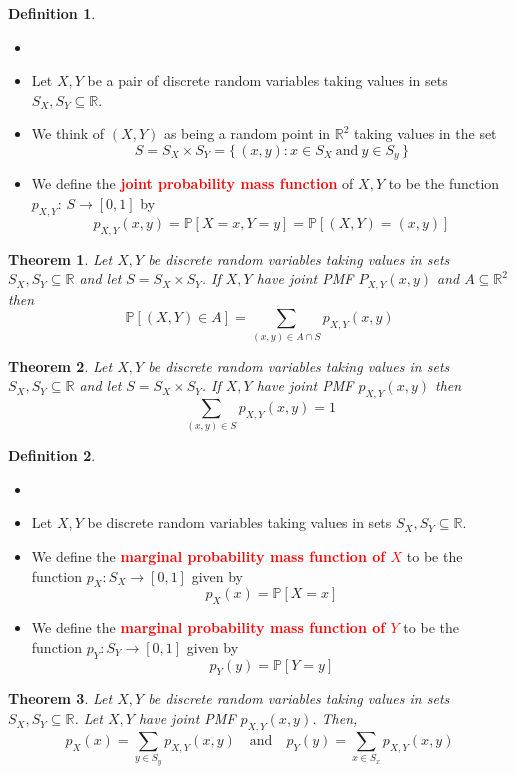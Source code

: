 \documentclass{article}
\newcommand{\PP}{\mathbb{P}}
\newcommand{\R}{\mathbb{R}}
\newcommand{\bfred}[1]{\textcolor{red}{\textbf{#1}}}
\theoremstyle{plain}
\newtheorem{thm}{Theorem}[section]
\theoremstyle{definition}
\newtheorem{defn}{Definition}[section]
\theoremstyle{remark}
\begin{document}
\begin{defn}
    \begin{itemize}
        \item []
        \item Let $X,Y$ be a pair of discrete random variables taking values in sets $S_X,S_Y\subseteq\R$.
        \item We think of $(X,Y)$ as being a random point in $\R^2$ taking values in the set \[S=S_X\times S_Y=\{\,(x,y):x\in S_X \ \text{and} \ y\in S_y\,\}\]
        \item We define the \bfred{joint probability mass function} of $X,Y$ to be the function $p_{X,Y}$: $S\rightarrow[0,1]$ by \[p_{X,Y}(x,y)=\PP[X=x,Y=y]=\PP[(X,Y)=(x,y)]\]
    \end{itemize}
\end{defn}

\begin{thm}
    Let $X,Y$ be discrete random variables taking values in sets $S_X,S_Y\subseteq\R$ and let $S=S_X\times S_Y$. If $X,Y$ have joint PMF $P_{X,Y}(x,y)$ and $A\subseteq\R^2$ then \[\PP[(X,Y)\in A]=\sum_{(x,y)\in A \cap S}p_{X,Y}(x,y)\]
\end{thm}

\begin{thm}
    Let $X,Y$ be discrete random variables taking values in sets $S_X,S_Y\subseteq\R$ and let $S=S_X\times S_Y$. If $X,Y$ have joint PMF $p_{X,Y}(x,y)$ then \[\sum_{(x,y)\in S}p_{X,Y}(x,y)=1\]
\end{thm}

\begin{defn}
    \begin{itemize}
        \item []
        \item Let $X,Y$ be discrete random variables taking values in sets $S_X,S_Y\subseteq\R$.
        \item We define the \bfred{marginal probability mass function of $X$} to be the function $p_X:S_X\rightarrow[0,1]$ given by \[p_X(x)=\PP[X=x]\]
        \item We define the \bfred{marginal probability mass function of $Y$} to be the function $p_Y:S_Y\rightarrow[0,1]$ given by \[p_Y(y)=\PP[Y=y]\]
    \end{itemize}
\end{defn}

\begin{thm}
    Let $X,Y$ be discrete random variables taking values in sets $S_X,S_Y\subseteq\R$. Let $X,Y$ have joint PMF $p_{X,Y}(x,y)$. Then, \[p_X(x)=\sum_{y\in S_y}p_{X,Y}(x,y)\quad\text{and}\quad p_Y(y)=\sum_{x\in S_x}p_{X,Y}(x,y)\]
\end{thm}
\end{document}
